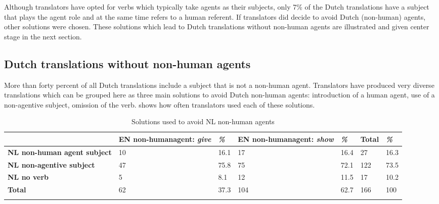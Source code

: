 \documentclass[output=paper]{LSP/langsci}
\begin{document}


Although translators have opted for verbs which typically take agents as their subjects, only 7\% of the Dutch translations have a subject that plays the agent role and at the same time refers to a human referent. If translators did decide to avoid Dutch (non-human) agents, other solutions were chosen. These solutions which lead to Dutch translations without non-human agents are illustrated and given center stage in the next section.  

\subsection{Dutch translations without non-human agents}
More than forty percent of all Dutch translations include a subject that is not a non-human agent. Translators have produced very diverse translations which can be grouped here as three main solutions to avoid Dutch non-human agents: introduction of a human agent, use of a non-agentive subject, omission of the verb.  shows how often translators used each of these solutions. 

\begin{table}
     \centering
     \begin{tabularx}{\textwidth}{XXXXXXX}
     \lsptoprule
                  &  EN non-human\newline agent: \textit{give}   & \textit{\%}  & EN non-human\newline agent: \textit{show}  & \textit{\%} & Total & \textit{\%} \\ \midrule
       \textbf{NL non-human agent subject}  & 10          & 16.1     & 17	          & 16.4      & 27   & 16.3 \\
       \textbf{NL non-agentive subject}     & 47          & 75.8     & 75             & 72.1       & 122   & 73.5  \\
       \textbf{NL no verb}           & 5    & 8.1         & 12       & 11.5       & 17   & 10.2 \\  \midrule
       \textbf{Total}                & 62   & 37.3        & 104      & 62.7       & 166   & 100  \\ 
       
     \lspbottomrule
     \end{tabularx}
 
     \caption{Solutions used to avoid NL non-human agents}
     \label{tab:5.3}
 
   \end{table}
\end{document}
